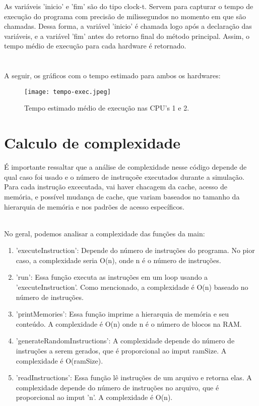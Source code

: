 \documentclass{article}
\begin{document}
\clearpage
As variáveis 'inicio' e 'fim' são do tipo clock-t. Servem para capturar o tempo de execução do programa com precisão de milissegundos no momento em que são chamadas. Dessa forma, a variável 'inicio' é chamada logo após a declaração das variáveis, e a variável 'fim' antes do retorno final do método principal. Assim, o tempo médio de execução para cada hardware é retornado.\\ \\
\\A seguir, os gráficos com o tempo estimado para ambos os hardwares:

\begin{figure}[!htb]
    \centering
    \texttt{[image: tempo-exec.jpeg]}
    \caption{Tempo estimado médio de execução nas CPU's 1 e 2.}
    \label{fig:frog}
\end{figure}

\clearpage
\section{Calculo de complexidade}

É importante ressaltar que a análise de complexidade nesse código depende de qual caso foi usado e o número de instruçoẽe executados durante a simulação. Para cada instrução excecutada, vai haver chacagem da cache, acesso de memória, e possível mudança de cache, que variam baseados no tamanho da hierarquia de memória e nos padrões de acesso específicos.

\\
No geral, podemos analisar a complexidade das funções da main:

\begin{enumerate}
    \item 'executeInstruction': Depende do número de instruções do programa. No pior caso, a complexidade seria O(n), onde n é o número de instruções.
    \item 'run': Essa função executa as instruções em um loop usando a 'executeInstruction'. Como mencionado, a complexidade é O(n) baseado no número de instruções.
    \item 'printMemories': Essa função imprime a hierarquia de memória e seu conteúdo. A complexidade é O(n) onde n é o número de blocos na RAM.
    \item 'generateRandomInstructions': A complexidade depende do número de instruções a serem gerados, que é proporcional ao imput ramSize. A complexidade é O(ramSize).
    \item 'readInstructions': Essa função lê instruções de um arquivo e retorna elas. A complexidade depende do número de instruções no arquivo, que é proporcional ao imput 'n'. A complexidade é O(n).
\end{enumerate}
\end{document}
